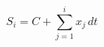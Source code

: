 \documentclass[12pt]{article}
\begin{document}
\sicpsize
\[
S_i = C + \sum\limits_{j=1}^{i}x_j \, dt
\]
\end{document}
